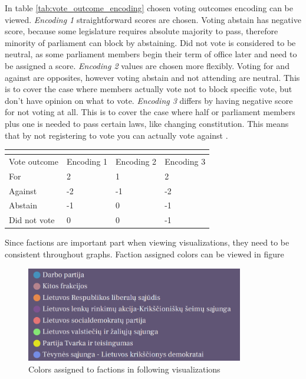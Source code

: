 \documentclass[a4paper,12pt]{article}
\begin{document}
   	In table \ref{tab:vote_outcome_encoding} chosen voting outcomes encoding can be viewed. \textit{Encoding 1} straightforward scores are chosen. Voting abstain has negative score, because some legislature requires absolute majority to pass, therefore minority of parliament can block by abstaining. Did not vote is considered to be neutral, as some parliament members begin their term of office later and need to be assigned a score. \textit{Encoding 2} values are chosen more flexibly. Voting for and against are opposites, however voting abstain and not attending are neutral. This is to cover the case where members actually vote not to block specific vote, but don't have opinion on what to vote. \textit{Encoding 3} differs by having negative score for not voting at all. This is to cover the case where half or parliament members plus one is needed to pass certain laws, like changing constitution. This means that by not registering to vote you can actually vote against \cite{konstitucija}.
 
 	\noindent
   	\begin{center}
   		\begin{tabular}{L{3cm} C{2cm} C{2cm} C{2cm}}
   			\\ 
   			\hline
   			Vote outcome & Encoding 1 & Encoding 2& Encoding 3  \\\hline
   			For & 2 & 1 & 2 \\
 			Against & -2 & -1 & -2\\
 			Abstain & -1 & 0 & -1\\
 			Did not vote & 0 & 0 & -1\\
   			\hline
   		\end{tabular}
   		 \label{tab:vote_outcome_encoding}
   	\end{center}
   
   	Since factions are important part when viewing visualizations, they need to be consistent throughout graphs. Faction assigned colors can be viewed in figure 
   	
 	\begin{figure}[H]	
  		\centering
  		\includegraphics[width=9.5cm]{images/faction_colors.png}
  		\caption{Colors assigned to factions in following visualizations}
  		\label{fig:faction_colors}
   	\end{figure}
   
\end{document}
